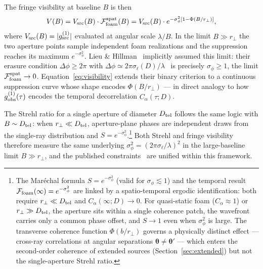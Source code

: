 \documentclass[aps,prd,onecolumn,amsmath,amssymb]{revtex4-2}
\begin{document}
The fringe visibility at baseline $B$ is then
\begin{equation}
  V(B) = V_{\rm src}(B)\cdot\mathcal{F}_{\rm foam}^{\rm spat}(B)
       = V_{\rm src}(B)\cdot e^{-\sigma_\phi^2[1-\Phi(B/r_\perp)]},
  \label{eq:visibility}
\end{equation}
where $V_{\rm src}(B) = |g^{(1)}_{\rm src}|$ evaluated at angular scale
$\lambda/B$. In the limit $B\gg r_\perp$ the two aperture points sample
independent foam realizations and the suppression reaches its maximum
$e^{-\sigma_\phi^2}$. Lieu \&
Hillman~\cite{LieuHillman2003} implicitly assumed this limit: their
erasure condition $\Delta\phi \geq 2\pi$ with
$\Delta\phi \simeq 2\pi\sigma_\ell(D)/\lambda$~\cite{NgPerlman2022} is
precisely $\sigma_\phi \geq 1$, the limit
$\mathcal{F}_{\rm foam}^{\rm spat}\to 0$. Equation~\eqref{eq:visibility}
extends their binary criterion to a continuous suppression curve whose
shape encodes $\Phi(B/r_\perp)$ --- in direct analogy to how
$g^{(1)}_{\rm obs}(\tau)$ encodes the temporal decorrelation
$C_\alpha(\tau;D)$.

The Strehl ratio for a single aperture of diameter $D_{\rm tel}$ follows
the same logic with $B\sim D_{\rm tel}$: when $r_\perp\ll D_{\rm tel}$,
aperture-plane phases are independent draws from the single-ray
distribution and $S=e^{-\sigma_\phi^2}$.\footnote{%
  The Mar\'{e}chal formula $S = e^{-\sigma_\phi^2}$ (valid for
  $\sigma_\phi \lesssim 1$) and the temporal result
  $\mathcal{F}_{\rm foam}(\infty) = e^{-\sigma_\phi^2}$ are linked by a
  spatio-temporal ergodic identification: both require $r_\perp \ll D_{\rm tel}$
  and $C_\alpha(\infty;D)\to 0$. For quasi-static foam ($C_\alpha\approx 1$) or
  $r_\perp \gg D_{\rm tel}$, the aperture sits within a single coherence patch,
  the wavefront carries only a common phase offset, and $S\to 1$ even when
  $\sigma_\phi^2$ is large. The transverse coherence function $\Phi(b/r_\perp)$
  governs a physically distinct effect --- cross-ray correlations at angular
  separations $\boldsymbol{\theta}\neq\boldsymbol{\theta}'$ --- which enters
  the second-order coherence of extended sources (Section~\ref{sec:extended})
  but not the single-aperture Strehl ratio.}
Both Strehl and fringe visibility therefore measure the same underlying
$\sigma_\phi^2 = (2\pi\sigma_\ell/\lambda)^2$ in the large-baseline limit
$B\gg r_\perp$, and the published
constraints~\cite{LieuHillman2003,NgPerlman2022,Perlman2015,Christiansen2011,Ragazzoni2003}
are unified within this framework.

\end{document}
